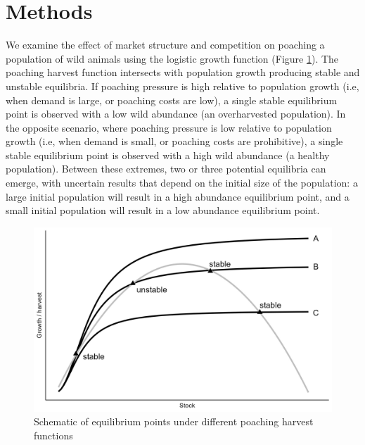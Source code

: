 \section{Methods}

We examine the effect of market structure and competition on poaching a population of wild animals using the logistic growth function (Figure \ref{fig:figure2}). The poaching harvest function intersects with population growth producing stable and unstable equilibria. If poaching pressure is high relative to population growth (i.e, when demand is large, or poaching costs are low), a single stable equilibrium point is observed with a low wild abundance (an overharvested population). In the opposite scenario, where poaching pressure is low relative to population growth (i.e, when demand is small, or poaching costs are prohibitive), a single stable equilibrium point is observed with a high wild abundance (a healthy population). Between these extremes, two or three potential equilibria can emerge, with uncertain results that depend on the initial size of the population: a large initial population will result in a high abundance equilibrium point, and a small initial population will result in a low abundance equilibrium point.

\begin{figure}[h]
    \centering
    \includegraphics[width=0.85\linewidth]{figures/totoaba/Figure1_potential_equilibria.jpg}
    \caption{Schematic of equilibrium points under different poaching harvest functions}
    \label{fig:figure2}
\end{figure}

